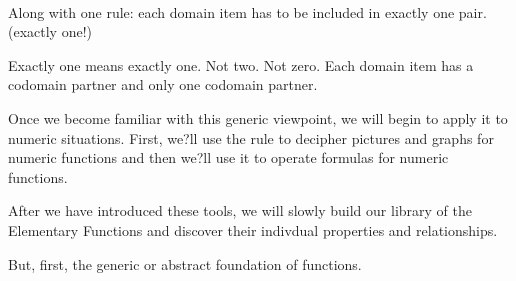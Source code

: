 \documentclass{ximera}
\begin{document}
\quad \\

Along with one rule: each domain item has to be included in exactly one pair. (exactly one!)

Exactly one means exactly one.  Not two. Not zero. Each domain item has a codomain partner and only one codomain partner.

Once we become familiar with this generic viewpoint, we will begin to apply it to numeric situations.  First, we?ll use the rule to decipher pictures and graphs for numeric functions and then we?ll use it to operate formulas for numeric functions.

After we have introduced these tools, we will slowly build our library of the Elementary Functions and discover their indivdual properties and relationships.

But, first, the generic or abstract foundation of functions.
\end{document}
